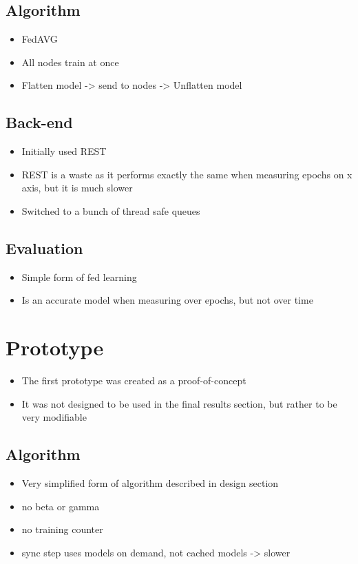 \subsection{Algorithm}
\begin{itemize}
	\item FedAVG
	\item All nodes train at once
	\item Flatten model -> send to nodes -> Unflatten model
\end{itemize}
\subsection{Back-end}
\begin{itemize}
	\item Initially used REST
	\item REST is a waste as it performs exactly the same when measuring epochs on x axis, but it is much slower
	\item Switched to a bunch of thread safe queues
\end{itemize}
\subsection{Evaluation}
\begin{itemize}
	\item Simple form of fed learning
	\item Is an accurate model when measuring over epochs, but not over time
\end{itemize}

\section{Prototype}
\begin{itemize}
	\item The first prototype was created as a proof-of-concept
	\item It was not designed to be used in the final results section, but rather to be very modifiable
\end{itemize}
\subsection{Algorithm}
\begin{itemize}
	\item Very simplified form of algorithm described in design section
	\item no beta or gamma
	\item no training counter
	\item sync step uses models on demand, not cached models -> slower
\end{itemize}
